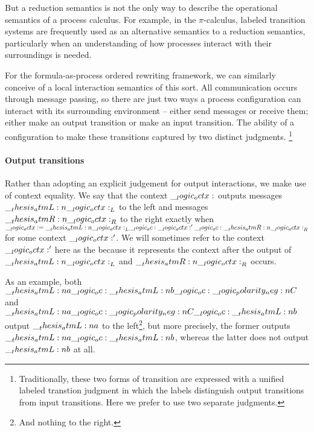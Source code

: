 But a reduction semantics is not the only way to describe the operational semantics of a process calculus.
For example, in the $\pi$-calculus, labeled transition systems are frequently used as an alternative semantics to a reduction semantics, particularly when an understanding of how processes interact with their surroundings is needed.

For the formula-as-process ordered rewriting framework, we can similarly conceive of a local interaction semantics of this sort.
All communication occurs through message passing, so there are just two ways a process configuration can interact with its surrounding environment -- either send messages or receive them; either make an output transition or make an input transition.
The ability of a configuration to make these transitions captured by two distinct judgments.%
\footnote{Traditionally, these two forms of transition are expressed with a unified labeled transtion judgment in which the labels distinguish output transitions from input transitions.
Here we prefer to use two separate judgments.}

\paragraph*{Output transitions}








Rather than adopting an explicit judgement for output interactions, we make use of context equality. 
We say that the context $\__logic_octx:$ outputs messages $\__thesis_atmL:n {\__logic_octx:}_L$ to the left and messages $\__thesis_atmR:n {\__logic_octx:}_R$ to the right exactly when $\__logic_octx: = \__thesis_atmL:n {\__logic_octx:}_L \__logic_oc: \__logic_octx:' \__logic_oc: \__thesis_atmR:n {\__logic_octx:}_R$ for some context $\__logic_octx:'$.
We will sometimes refer to the context $\__logic_octx:'$ here as the  because it represents the context after the output of $\__thesis_atmL:n {\__logic_octx:}_L$ and $\__thesis_atmR:n {\__logic_octx:}_R$ occurs.

As an example, both $\__thesis_atmL:n {a} \__logic_oc: \__thesis_atmL:n {b} \__logic_oc: \__logic_polarity_neg:n {C}$ and $\__thesis_atmL:n {a} \__logic_oc: \__logic_polarity_neg:n {C} \__logic_oc: \__thesis_atmL:n {b}$ output $\__thesis_atmL:n {a}$ to the left\footnote{And nothing to the right.}, but more precisely, the former outputs $\__thesis_atmL:n {a} \__logic_oc: \__thesis_atmL:n {b}$, whereas the latter does not output $\__thesis_atmL:n {b}$ at all.

